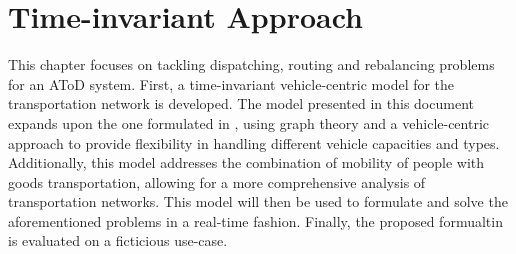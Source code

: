 \chapter{Time-invariant Approach}
This chapter focuses on tackling dispatching, routing and rebalancing problems for an AToD system. First, a time-invariant vehicle-centric model for the transportation network is developed. The model presented in this document expands upon the one formulated in \cite{project_thesis}, using graph theory and a vehicle-centric approach to provide flexibility in handling different vehicle capacities and types. Additionally, this model addresses the combination of mobility of people with goods transportation, allowing for a more comprehensive analysis of transportation networks. This model will then be used to formulate and solve the aforementioned problems in a real-time fashion. Finally, the proposed formualtin is evaluated on a ficticious use-case. 
